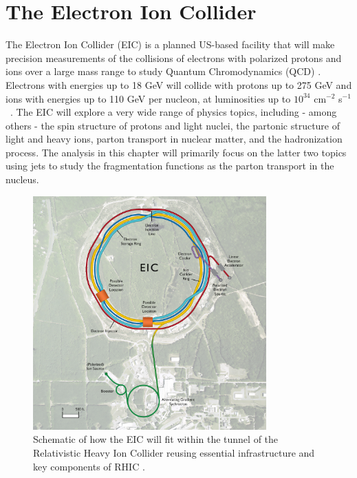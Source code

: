 \chapter{The Electron Ion Collider}
The Electron Ion Collider (EIC) is a planned US-based facility that will make precision measurements of the collisions of electrons with polarized protons 
and ions over a large mass range
%
to study Quantum Chromodynamics (QCD) \cite{Accardi:2012qut,Aschenauer:2017jsk}. Electrons with energies up to 18 GeV will collide with protons up to 275 GeV and ions with energies up to 110 GeV per nucleon, at luminosities up to $10^{34}$ cm$^{-2}$ s$^{-1}$~\cite{eRHIC:preCDR}. The EIC will explore a very wide range of physics topics, including - among others - the spin structure of protons and light nuclei, the partonic structure of light and heavy ions, parton transport in nuclear matter, and the hadronization process. The analysis in this chapter will primarily focus on the latter two topics using jets to study the fragmentation functions as the parton transport in the nucleus. 


\begin{figure}[htpb]
  \centering
  \includegraphics[width=0.8\textwidth]{EIC_Jets/eic.jpg}
  \caption{Schematic of how the EIC will fit within the tunnel of the Relativistic Heavy Ion Collider reusing essential infrastructure and key components of RHIC \cite{zotero-283}.}
  \label{fig:eic}
\end{figure}

